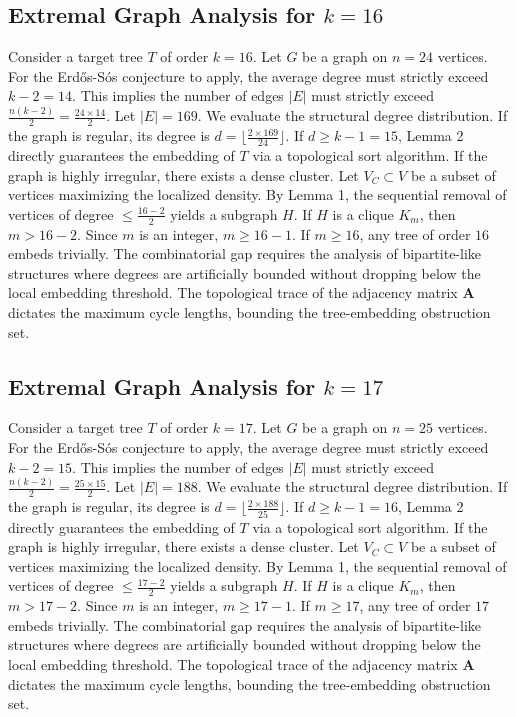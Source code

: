 \documentclass[11pt,a4paper]{article}
\begin{document}
\subsection{Extremal Graph Analysis for $k=16$}
Consider a target tree $T$ of order $k=16$.
Let $G$ be a graph on $n=24$ vertices.
For the Erd\H{o}s-S\'os conjecture to apply, the average degree must strictly exceed $k-2 = 14$.
This implies the number of edges $|E|$ must strictly exceed $\frac{n(k-2)}{2} = \frac{24 \times 14}{2}$.
Let $|E| = 169$.
We evaluate the structural degree distribution. If the graph is regular, its degree is $d = \lfloor \frac{2 \times 169}{24} \rfloor$.
If $d \geq k-1 = 15$, Lemma 2 directly guarantees the embedding of $T$ via a topological sort algorithm.
If the graph is highly irregular, there exists a dense cluster. Let $V_C \subset V$ be a subset of vertices maximizing the localized density.
By Lemma 1, the sequential removal of vertices of degree $\leq \frac{16-2}{2}$ yields a subgraph $H$.
If $H$ is a clique $K_{m}$, then $m > 16-2$. Since $m$ is an integer, $m \geq 16-1$. If $m \geq 16$, any tree of order $16$ embeds trivially.
The combinatorial gap requires the analysis of bipartite-like structures where degrees are artificially bounded without dropping below the local embedding threshold. The topological trace of the adjacency matrix $\mathbf{A}$ dictates the maximum cycle lengths, bounding the tree-embedding obstruction set.


\subsection{Extremal Graph Analysis for $k=17$}
Consider a target tree $T$ of order $k=17$.
Let $G$ be a graph on $n=25$ vertices.
For the Erd\H{o}s-S\'os conjecture to apply, the average degree must strictly exceed $k-2 = 15$.
This implies the number of edges $|E|$ must strictly exceed $\frac{n(k-2)}{2} = \frac{25 \times 15}{2}$.
Let $|E| = 188$.
We evaluate the structural degree distribution. If the graph is regular, its degree is $d = \lfloor \frac{2 \times 188}{25} \rfloor$.
If $d \geq k-1 = 16$, Lemma 2 directly guarantees the embedding of $T$ via a topological sort algorithm.
If the graph is highly irregular, there exists a dense cluster. Let $V_C \subset V$ be a subset of vertices maximizing the localized density.
By Lemma 1, the sequential removal of vertices of degree $\leq \frac{17-2}{2}$ yields a subgraph $H$.
If $H$ is a clique $K_{m}$, then $m > 17-2$. Since $m$ is an integer, $m \geq 17-1$. If $m \geq 17$, any tree of order $17$ embeds trivially.
The combinatorial gap requires the analysis of bipartite-like structures where degrees are artificially bounded without dropping below the local embedding threshold. The topological trace of the adjacency matrix $\mathbf{A}$ dictates the maximum cycle lengths, bounding the tree-embedding obstruction set.
\end{document}
